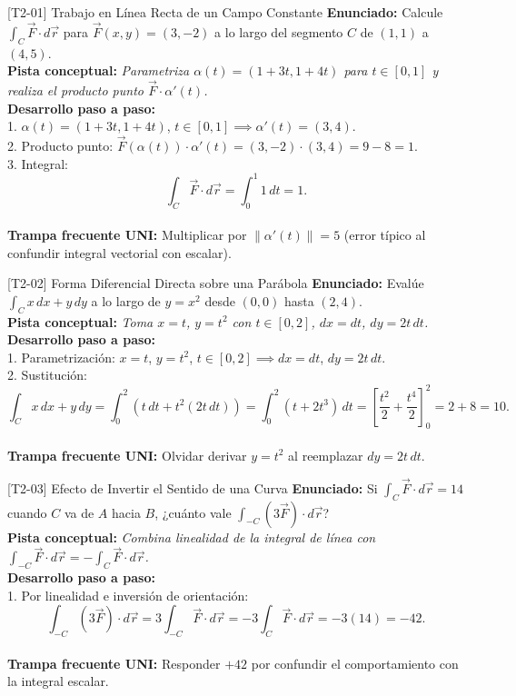 \documentclass[11pt,a4paper]{article}
\begin{document}
\begin{ejerciciobox}{[T2-01] Trabajo en Línea Recta de un Campo Constante}
\textbf{Enunciado:} Calcule $\int_C \vec{F}\cdot d\vec{r}$ para $\vec{F}(x,y) = (3, -2)$ a lo largo del segmento $C$ de $(1,1)$ a $(4,5)$.\\[0.2cm]
\textbf{Pista conceptual:} \emph{Parametriza $\alpha(t) = (1+3t, 1+4t)$ para $t \in [0,1]$ y realiza el producto punto $\vec{F}\cdot\alpha'(t)$.}\\[0.2cm]
\textbf{Desarrollo paso a paso:}\\
1. $\alpha(t) = (1+3t, 1+4t)$, $t \in [0,1] \implies \alpha'(t) = (3, 4)$.\\
2. Producto punto: $\vec{F}(\alpha(t))\cdot\alpha'(t) = (3,-2)\cdot(3,4) = 9 - 8 = 1$.\\
3. Integral:\\
$$\int_C \vec{F}\cdot d\vec{r} = \int_0^1 1\,dt = 1.$$\\[0.2cm]
\textbf{Trampa frecuente UNI:} Multiplicar por $\|\alpha'(t)\| = 5$ (error típico al confundir integral vectorial con escalar).
\end{ejerciciobox}

\begin{ejerciciobox}{[T2-02] Forma Diferencial Directa sobre una Parábola}
\textbf{Enunciado:} Evalúe $\int_C x\,dx + y\,dy$ a lo largo de $y = x^2$ desde $(0,0)$ hasta $(2,4)$.\\[0.2cm]
\textbf{Pista conceptual:} \emph{Toma $x = t$, $y = t^2$ con $t \in [0,2]$, $dx = dt$, $dy = 2t\,dt$.}\\[0.2cm]
\textbf{Desarrollo paso a paso:}\\
1. Parametrización: $x = t$, $y = t^2$, $t \in [0,2] \implies dx = dt$, $dy = 2t\,dt$.\\
2. Sustitución:\\
$$\int_C x\,dx + y\,dy = \int_0^2 \left(t\,dt + t^2(2t\,dt)\right) = \int_0^2 (t + 2t^3)\,dt = \left[\frac{t^2}{2} + \frac{t^4}{2}\right]_0^2 = 2 + 8 = 10.$$\\[0.2cm]
\textbf{Trampa frecuente UNI:} Olvidar derivar $y = t^2$ al reemplazar $dy = 2t\,dt$.
\end{ejerciciobox}

\begin{ejerciciobox}{[T2-03] Efecto de Invertir el Sentido de una Curva}
\textbf{Enunciado:} Si $\int_C \vec{F}\cdot d\vec{r} = 14$ cuando $C$ va de $A$ hacia $B$, ¿cuánto vale $\int_{-C} (3\vec{F})\cdot d\vec{r}$?\\[0.2cm]
\textbf{Pista conceptual:} \emph{Combina linealidad de la integral de línea con $\int_{-C} \vec{F}\cdot d\vec{r} = -\int_C \vec{F}\cdot d\vec{r}$.}\\[0.2cm]
\textbf{Desarrollo paso a paso:}\\
1. Por linealidad e inversión de orientación:\\
$$\int_{-C} (3\vec{F})\cdot d\vec{r} = 3\int_{-C} \vec{F}\cdot d\vec{r} = -3\int_C \vec{F}\cdot d\vec{r} = -3(14) = -42.$$\\[0.2cm]
\textbf{Trampa frecuente UNI:} Responder $+42$ por confundir el comportamiento con la integral escalar.
\end{ejerciciobox}
\end{document}
